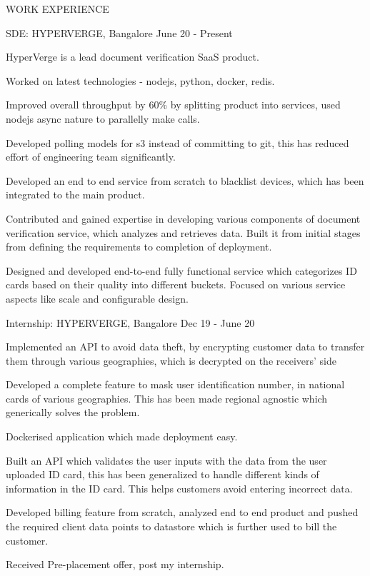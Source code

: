 \documentclass{resume} %
\begin{document}
\begin{rSection}{ WORK EXPERIENCE }

\begin{rSubsection}{ SDE: HYPERVERGE, Bangalore} {June 20 - Present}{}
    
    \item HyperVerge is a lead document verification SaaS product.
    \item Worked on latest technologies - nodejs, python, docker, redis.
    \item Improved overall throughput by 60\% by splitting product into services, used nodejs async nature to parallelly make calls.
    \item Developed polling models for s3 instead of committing to git, this has reduced effort of engineering team significantly.
    \item Developed an end to end service from scratch to blacklist devices, which has been integrated to the main product.
    \item Contributed and gained expertise in developing various components of document verification service, which analyzes and retrieves data. Built it from initial stages from defining the requirements to completion of deployment.
    \item Designed and developed end-to-end fully functional service which categorizes ID cards based on their quality into different buckets. Focused on various service aspects like scale and configurable design.
    
\end{rSubsection}

\begin{rSubsection}{ Internship: HYPERVERGE, Bangalore} {Dec 19 - June 20}{}
    
    \item Implemented an API to avoid data theft, by encrypting customer data to transfer them through various geographies, which is decrypted on the receivers' side
    \item Developed a complete feature to mask user identification number, in national cards of various geographies. This has been made regional agnostic which generically solves the problem.
    \item Dockerised application which made deployment easy.
    \item Built an API which validates the user inputs with the data from the user uploaded ID card, this has been generalized to handle different kinds of information in the ID card. This helps customers avoid entering incorrect data.
    \item Developed billing feature from scratch, analyzed end to end product and pushed the required client data points to datastore which is further used to bill the customer.
    \item Received Pre-placement offer, post my internship.
    \\
    

\end{rSubsection}
\end{rSection}
\end{document}
